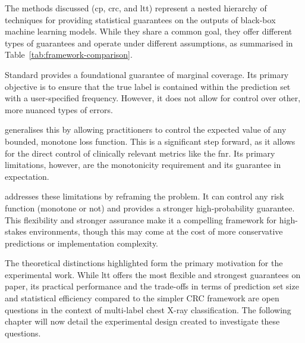 The methods discussed (\gls{cp}, \gls{crc}, and \gls{ltt}) represent
a nested hierarchy of techniques for providing statistical guarantees
on the outputs of black-box machine learning models.
While they share a common goal,
they offer different types of guarantees and operate under different assumptions,
as summarised in Table~\ref{tab:framework-comparison}.

Standard  provides a foundational guarantee of marginal coverage.
Its primary objective is to ensure that the true label is contained
within the prediction set with a user-specified frequency.
However, it does not allow for control over other, more nuanced types of errors.

 generalises this by allowing practitioners
to control the expected value of any bounded, monotone loss function.
This is a significant step forward,
as it allows for the direct control of clinically relevant metrics like the \gls{fnr}.
Its primary limitations, however, are the monotonicity requirement
and its guarantee in expectation.

 addresses these limitations by reframing the problem.
It can control any risk function (monotone or not) and provides a stronger high-probability guarantee.
This flexibility and stronger assurance make it a compelling framework for high-stakes environments,
though this may come at the cost of more conservative predictions or implementation complexity.

The theoretical distinctions highlighted form the primary motivation
for the experimental work.
While \gls{ltt} offers the most flexible and strongest guarantees on paper,
its practical performance and the trade-offs
in terms of prediction set size and statistical efficiency
compared to the simpler CRC framework are open questions
in the context of multi-label chest X-ray classification.
The following chapter will now detail the experimental design created to investigate these questions.
